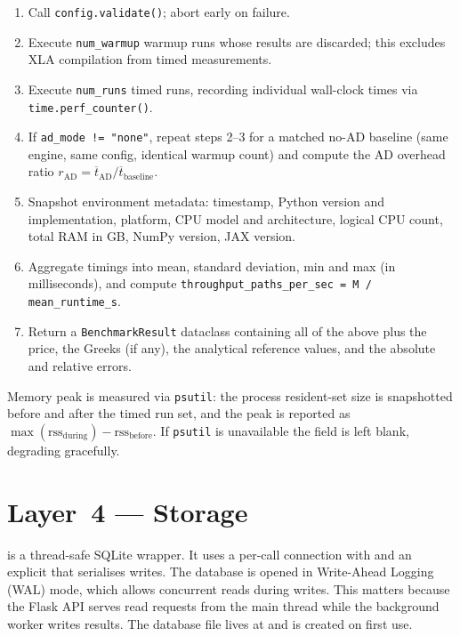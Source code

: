 \begin{enumerate}
    \item Call \texttt{config.validate()}; abort early on failure.
    \item Execute \texttt{num\_warmup} warmup runs whose results are discarded;
          this excludes XLA compilation from timed measurements.
    \item Execute \texttt{num\_runs} timed runs, recording individual wall-clock
          times via \texttt{time.perf\_counter()}.
    \item If \texttt{ad\_mode != "none"}, repeat steps 2--3 for a matched
          no-AD baseline (same engine, same config, identical warmup count) and
          compute the AD overhead ratio
          $r_{\text{AD}} = \overline{t}_{\text{AD}} / \overline{t}_{\text{baseline}}$.
    \item Snapshot environment metadata: timestamp, Python version and
          implementation, platform, CPU model and architecture, logical CPU
          count, total RAM in GB, NumPy version, JAX version.
    \item Aggregate timings into mean, standard deviation, min and max
          (in milliseconds), and compute
          \texttt{throughput\_paths\_per\_sec = M / mean\_runtime\_s}.
    \item Return a \texttt{BenchmarkResult} dataclass containing all of the
          above plus the price, the Greeks (if any), the analytical reference
          values, and the absolute and relative errors.
\end{enumerate}

Memory peak is measured via \texttt{psutil}: the process resident-set size is
snapshotted before and after the timed run set, and the peak is reported as
$\max(\mathrm{rss}_{\text{during}}) - \mathrm{rss}_{\text{before}}$. If
\texttt{psutil} is unavailable the field is left blank, degrading gracefully.

\section{Layer~4 --- Storage}
\label{sec:storage-layer}

 is a thread-safe SQLite wrapper. It uses a per-call connection
with  and an explicit  that
serialises writes. The database is opened in Write-Ahead Logging (WAL) mode, which
allows concurrent reads during writes. This matters because the Flask API serves
read requests from the main thread while the background worker writes results.
The database file lives at  and is created on first
use.

